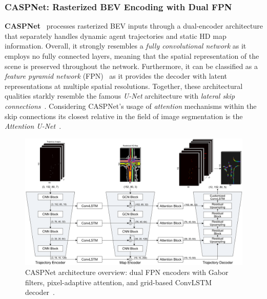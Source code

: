 \subsubsection*{CASPNet: Rasterized BEV Encoding with Dual FPN}

\textbf{CASPNet}~\cite{caspnetSchäfer2022} processes rasterized BEV inputs through a dual-encoder architecture that separately handles dynamic agent trajectories and static HD map information. Overall, it strongly resembles a \emph{fully convolutional network} as it employs no fully connected layers, meaning that the spatial representation of the scene is preserved throughout the network. Furthermore, it can be classified as a \emph{feature pyramid network} (FPN)~\cite{FPNLin2017} as it provides the decoder with latent representations at multiple spatial resolutions. Together, these architectural qualities starkly resemble the famous \emph{U-Net} architecture with \emph{lateral skip connections}~\cite{UNetLSRonneberger2015}. Considering CASPNet's usage of \emph{attention} mechanisms within the skip connections its closest relative in the field of image segmentation is the \emph{Attention U-Net}~\cite{UNetAttnOktay2018}.

\begin{figure}[ht]
  \centering
  \includegraphics[width=\linewidth]{figures/caspnet_arch.png}
  \caption{CASPNet architecture overview: dual FPN encoders with Gabor filters, pixel-adaptive attention, and grid-based ConvLSTM decoder~\cite{caspnetSchäfer2022}.}
  \label{fig:caspnet_overview}
\end{figure}

